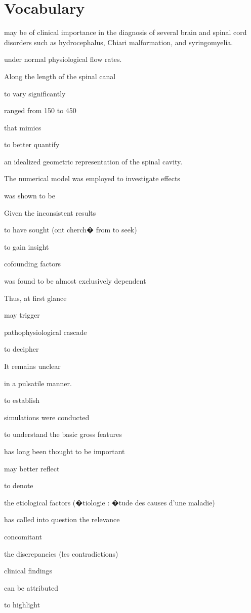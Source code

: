 \documentclass{article}
\begin{document}
\section{Vocabulary}
may be of clinical importance in the diagnosis of
several brain and spinal cord disorders such as hydrocephalus, Chiari malformation, and
syringomyelia.

under normal physiological flow rates.

Along the length of the
spinal canal

to vary significantly

ranged from 150 to 450

that mimics

to better quantify

an idealized geometric representation of the spinal cavity.

The numerical model was employed to investigate effects

was shown to be

Given the inconsistent results

to have sought (ont cherch� from to seek)

to gain insight

cofounding factors

was found to be
almost exclusively dependent

Thus, at first glance

may trigger

pathophysiological cascade

to decipher

It remains
unclear

in a pulsatile manner.

to establish


simulations were conducted

to
understand the basic gross features

has long been thought to be important

may better reflect

to denote

the etiological factors (�tiologie : �tude des causes d'une maladie)

has called into question
the relevance

concomitant

the discrepancies (les contradictions)

clinical findings

can be attributed

to highlight
\end{document}

